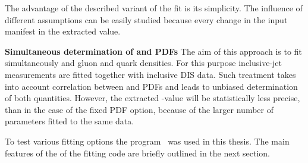The advantage of the described variant of the fit is its simplicity. The influence of different assumptions can be easily studied because every change in the input manifest in the extracted \asz value. 

{\flushleft \textbf{Simultaneous determination of \asz and PDFs}}\newline
The aim of this approach is to fit simultaneously \asz and gluon and quark densities. For this purpose inclusive-jet measurements are fitted together with inclusive DIS data. Such treatment takes into account correlation between \as and PDFs and leads to unbiased determination of both quantities. However, the extracted \asz-value will be statistically less precise, than in the case of the fixed PDF option, because of the larger number of parameters fitted to the same data.

To test various fitting options the \herafitter program~\cite{herafitter} was used in this thesis. The main features of the of the fitting code are briefly outlined in the next section. 